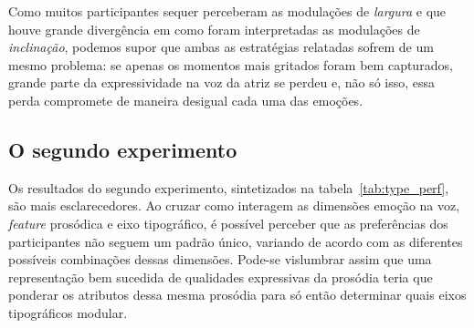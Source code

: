 \documentclass{tufte-handout}
\begin{document}
Como muitos participantes sequer perceberam as modulações de \textit{largura} e que houve grande divergência em como foram interpretadas as modulações de \textit{inclinação}, podemos supor que ambas as estratégias relatadas sofrem de um mesmo problema: se apenas os momentos mais gritados foram bem capturados, grande parte da expressividade na voz da atriz se perdeu e, não só isso, essa perda compromete de maneira desigual cada uma das emoções.

\subsection{O segundo experimento}

Os resultados do segundo experimento, sintetizados na tabela~\ref{tab:type_perf}, são mais esclarecedores. Ao cruzar como interagem as dimensões emoção na voz, \textit{feature} prosódica e eixo tipográfico, é possível perceber que as preferências dos participantes não seguem um padrão único, variando de acordo com as diferentes possíveis combinações dessas dimensões. Pode-se vislumbrar assim que uma representação bem sucedida de qualidades expressivas da prosódia teria que ponderar os atributos dessa mesma prosódia para só então determinar quais eixos tipográficos modular.
\end{document}
